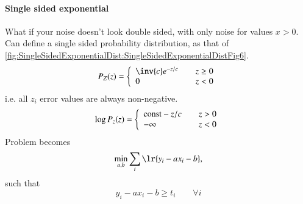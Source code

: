 \paragraph{Single sided exponential}
What if your noise doesn't look double sided, with only noise for values \( x > 0 \).  Can define a single sided probability distribution, as that of \cref{fig:SingleSidedExponentialDist:SingleSidedExponentialDistFig6}.
%
\begin{equation}\label{eqn:L1introduction:600}
P_Z(z) =
\left\{
\begin{array}{l l}
\inv{c} e^{-z/c} & \quad \mbox{\( z \ge 0 \)} \\
0 & \quad \mbox{\( z < 0 \)}
\end{array}
\right.
\end{equation}
%
i.e. all \( z_i \) error values are always non-negative.
%
\begin{equation}\label{eqn:L1introduction:620}
\log P_z(z) =
\left\{
\begin{array}{l l}
\textrm{const} - z/c & \quad \mbox{\( z > 0\)} \\
-\infty & \quad \mbox{\( z< 0\)}
\end{array}
\right.
\end{equation}
%
Problem becomes
\begin{equation}\label{eqn:L1introduction:640}
\min_{a, b} \sum_i \lr{ y_i - a x_i - b },
\end{equation}
such that
\begin{equation}\label{eqn:L1introduction:660}
y_i - a x_i - b \ge t_i \qquad \forall i
\end{equation}
